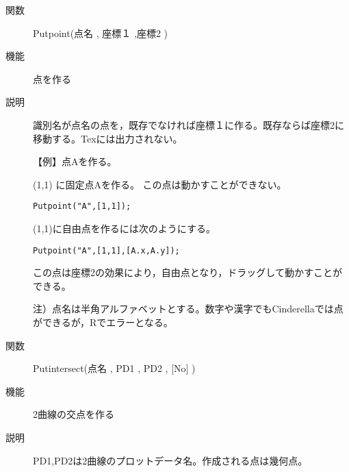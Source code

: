 \documentclass[papersize,a4paper,10pt,uplatex]{jsarticle}
\begin{document}
\begin{description}








\vspace{\baselineskip}
\hypertarget{putpoint}{}
\item[関数]Putpoint(点名 , 座標１ ,座標2 )
\item[機能]点を作る
\item[説明]識別名が点名の点を，既存でなければ座標１に作る。既存ならば座標2に移動する。Texには出力されない。

\vspace{\baselineskip}
【例】点Aを作る。

(1,1) に固定点Aを作る。 この点は動かすことができない。

\hspace{10mm} \verb|Putpoint("A",[1,1]);|
 
(1,1)に自由点を作るには次のようにする。

\hspace{10mm}\verb|Putpoint("A",[1,1],[A.x,A.y]);|
 
この点は座標2の効果により，自由点となり，ドラッグして動かすことができる。

\vspace{\baselineskip}
注）点名は半角アルファベットとする。数字や漢字でもCinderellaでは点ができるが，Rでエラーとなる。

\vspace{\baselineskip}
\hypertarget{putintersect}{}
\item[関数]Putintersect(点名 , PD1 , PD2 , [No] )
\item[機能]2曲線の交点を作る
\item[説明]PD1,PD2は2曲線のプロットデータ名。作成される点は幾何点。


\end{description}
\end{document}
